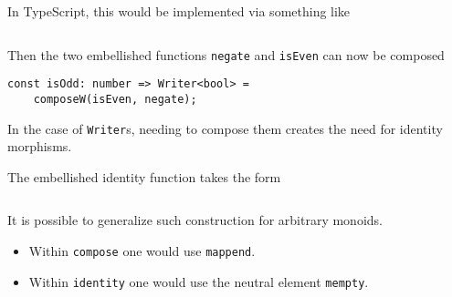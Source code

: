 \begin{remark}
    In TypeScript, this would be implemented via something like
    \inputminted{typescript}{content/code-listings/writer-compose.ts}
    
    Then the two embellished functions \texttt{negate} and \texttt{isEven} can now be composed
    
    \begin{verbatim}
const isOdd: number => Writer<bool> = 
    composeW(isEven, negate);
    \end{verbatim}
\end{remark}

\begin{remark}
    In the case of \texttt{Writer}s, needing to compose them creates the need for identity morphisms.
\end{remark}

\begin{definition}
    The embellished identity function takes the form
    \inputminted{typescript}{content/code-listings/writer-id.ts}
\end{definition}

\begin{remark}
    It is possible to generalize such construction for arbitrary monoids. 
    \begin{itemize}
        \item Within \texttt{compose} one would use \texttt{mappend}.
        \item Within \texttt{identity} one would use the neutral element \texttt{mempty}.
    \end{itemize}
\end{remark}

